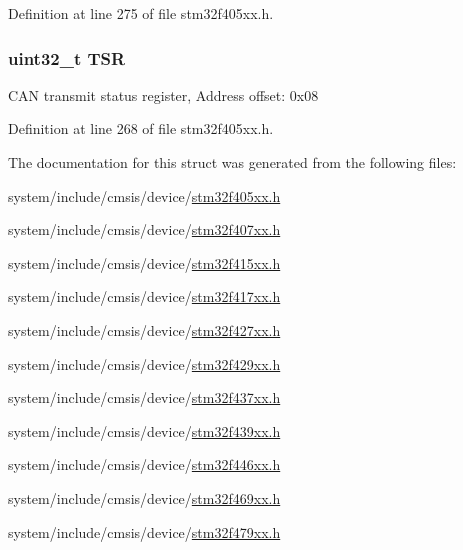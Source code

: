 Definition at line 275 of file stm32f405xx.\+h.

\subsubsection[{\texorpdfstring{T\+SR}{TSR}}]{ uint32\+\_\+t T\+SR}\hypertarget{struct_c_a_n___type_def_a87e3001757a0cd493785f1f3337dd0e8}{}\label{struct_c_a_n___type_def_a87e3001757a0cd493785f1f3337dd0e8}
C\+AN transmit status register, Address offset\+: 0x08 

Definition at line 268 of file stm32f405xx.\+h.



The documentation for this struct was generated from the following files\+:\begin{DoxyCompactItemize}
\item 
system/include/cmsis/device/\hyperlink{stm32f405xx_8h}{stm32f405xx.\+h}\item 
system/include/cmsis/device/\hyperlink{stm32f407xx_8h}{stm32f407xx.\+h}\item 
system/include/cmsis/device/\hyperlink{stm32f415xx_8h}{stm32f415xx.\+h}\item 
system/include/cmsis/device/\hyperlink{stm32f417xx_8h}{stm32f417xx.\+h}\item 
system/include/cmsis/device/\hyperlink{stm32f427xx_8h}{stm32f427xx.\+h}\item 
system/include/cmsis/device/\hyperlink{stm32f429xx_8h}{stm32f429xx.\+h}\item 
system/include/cmsis/device/\hyperlink{stm32f437xx_8h}{stm32f437xx.\+h}\item 
system/include/cmsis/device/\hyperlink{stm32f439xx_8h}{stm32f439xx.\+h}\item 
system/include/cmsis/device/\hyperlink{stm32f446xx_8h}{stm32f446xx.\+h}\item 
system/include/cmsis/device/\hyperlink{stm32f469xx_8h}{stm32f469xx.\+h}\item 
system/include/cmsis/device/\hyperlink{stm32f479xx_8h}{stm32f479xx.\+h}\end{DoxyCompactItemize}
